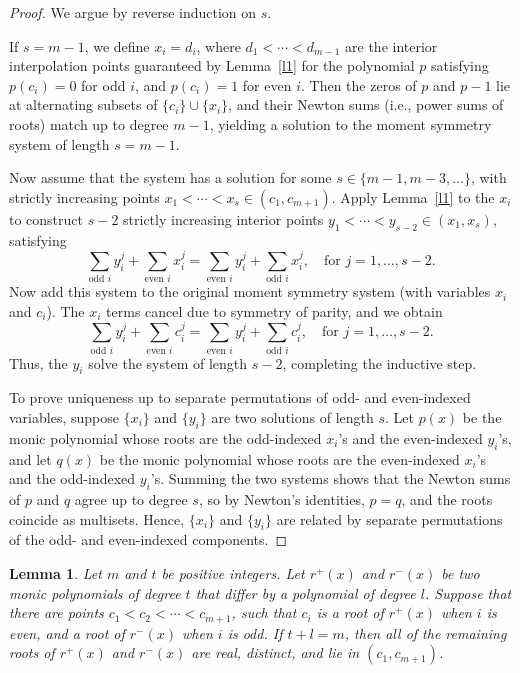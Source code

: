 \documentclass{raex}
\newtheorem{lemma}[theorem]{Lemma}
\theoremstyle{definition}
\begin{document}
\begin{proof}
We argue by reverse induction on \( s \).

If \( s = m - 1 \), we define \( x_i = d_i \), where \( d_1 < \cdots < d_{m-1} \) are the interior interpolation points guaranteed by Lemma~\ref{l1} for the polynomial \( p \) satisfying \( p(c_i) = 0 \) for odd \( i \), and \( p(c_i) = 1 \) for even \( i \). Then the zeros of \( p \) and \( p - 1 \) lie at alternating subsets of \( \{c_i\} \cup \{x_i\} \), and their Newton sums (i.e., power sums of roots) match up to degree \( m - 1 \), yielding a solution to the moment symmetry system of length \( s = m - 1 \).

Now assume that the system has a solution for some \( s \in \{m - 1, m - 3, \dots\} \), with strictly increasing points \( x_1 < \cdots < x_s \in (c_1, c_{m+1}) \). Apply Lemma~\ref{l1} to the \( x_i \) to construct \( s - 2 \) strictly increasing interior points \( y_1 < \cdots < y_{s-2} \in (x_1, x_s) \), satisfying
\[
\sum_{\text{odd } i} y_i^j + \sum_{\text{even } i} x_i^j = \sum_{\text{even } i} y_i^j + \sum_{\text{odd } i} x_i^j, \quad \text{for } j = 1, \dots, s - 2.
\]
Now add this system to the original moment symmetry system (with variables \( x_i \) and \( c_i \)). The \( x_i \) terms cancel due to symmetry of parity, and we obtain
\[
\sum_{\text{odd } i} y_i^j + \sum_{\text{even } i} c_i^j = \sum_{\text{even } i} y_i^j + \sum_{\text{odd } i} c_i^j, \quad \text{for } j = 1, \dots, s - 2.
\]
Thus, the \( y_i \) solve the system of length \( s - 2 \), completing the inductive step.

To prove uniqueness up to separate permutations of odd- and even-indexed variables, suppose \( \{x_i\} \) and \( \{y_i\} \) are two solutions of length \( s \). Let \( p(x) \) be the monic polynomial whose roots are the odd-indexed \( x_i \)'s and the even-indexed \( y_i \)'s, and let \( q(x) \) be the monic polynomial whose roots are the even-indexed \( x_i \)'s and the odd-indexed \( y_i \)'s. Summing the two systems shows that the Newton sums of \( p \) and \( q \) agree up to degree \( s \), so by Newton's identities, \( p = q \), and the roots coincide as multisets. Hence, \( \{x_i\} \) and \( \{y_i\} \) are related by separate permutations of the odd- and even-indexed components.
\end{proof}

\begin{lemma}\label{l99}
Let \( m \) and \( t \) be positive integers. Let \( r^+(x) \) and \( r^-(x) \) be two monic polynomials of degree \( t \) that differ by a polynomial of degree \( l \). Suppose that there are points \( c_1 < c_2 < \cdots < c_{m+1} \), such that \( c_i \) is a root of \( r^+(x) \) when \( i \) is even, and a root of \( r^-(x) \) when \( i \) is odd. If \( t + l = m \), then all of the remaining roots of \( r^+(x) \) and \( r^-(x) \) are real, distinct, and lie in \( (c_1, c_{m+1}) \).
\end{lemma}
\end{document}
